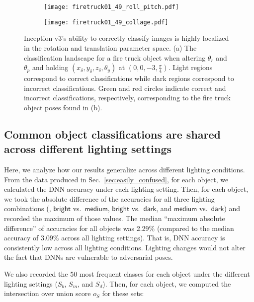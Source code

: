\documentclass[10pt,twocolumn,letterpaper]{article}
\newcommand{\bright}{\ensuremath{\mathsf{bright}}\xspace}
\newcommand{\medium}{\ensuremath{\mathsf{medium}}\xspace}
\newcommand{\dark}{\ensuremath{\mathsf{dark}}\xspace}
\begin{document}
\begin{figure}[h]
\begin{subfigure}{\linewidth}
    \texttt{[image: firetruck01\_49\_roll\_pitch.pdf]}
    \caption{}\label{fig:fire_truck_roll_pitch}
\end{subfigure}
\begin{subfigure}{\linewidth}
    \centering
    \texttt{[image: firetruck01\_49\_collage.pdf]}
    \caption{}\label{fig:fire_truck_pitch_roll_collage}
\end{subfigure}
\caption{
Inception-v3's ability to correctly classify images is highly localized in the rotation and translation parameter space.
(a) The classification landscape for a fire truck object when altering $\theta_{r}$ and $\theta_{p}$ and holding $(x_{\delta}, y_{\delta}, z_{\delta}, \theta_{y})$ at $(0, 0, -3, \frac{\pi}{4})$.
Light regions correspond to correct classifications while dark regions correspond to incorrect classifications.
Green and red circles indicate correct and incorrect classifications, respectively, corresponding to the fire truck object poses found in (b).
}\label{fig:landscape}
\end{figure}


\subsection{Common object classifications are shared across different lighting settings}



Here, we analyze how our results generalize across different lighting conditions.
From the data produced in Sec.~\ref{sec:easily_confused}, for each object, we calculated the
DNN accuracy under each lighting setting.
Then, for each object, we took the absolute difference of the accuracies for all three lighting combinations (\ie, \bright vs.~\medium, \bright vs.~\dark, and \medium vs.~\dark) and recorded the maximum of those values.
The median ``maximum absolute difference'' of accuracies for all objects was 2.29\% (compared to the median accuracy of $3.09\%$ across all lighting settings).
That is, DNN accuracy is consistently low across all lighting conditions.
Lighting changes would not alter the fact that DNNs are vulnerable to adversarial poses.

We also recorded the 50 most frequent classes for each object under the different lighting settings ($S_{b}$, $S_{m}$, and $S_{d}$).
Then, for each object, we computed the intersection over union score $o_{S}$ for these sets:
\end{document}
